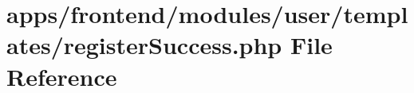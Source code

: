 \hypertarget{frontend_2modules_2user_2templates_2register_success_8php}{\section{apps/frontend/modules/user/templates/register\-Success.php File Reference}
\label{frontend_2modules_2user_2templates_2register_success_8php}
}
